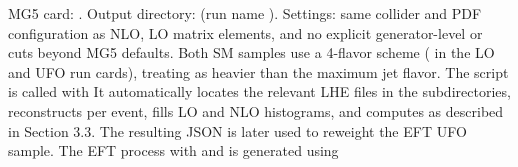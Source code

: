 \markdownRendererInterblockSeparator
{}\markdownRendererUlBeginTight
\markdownRendererUlItem MG5 card: .\markdownRendererUlItemEnd 
\markdownRendererUlItem Output directory:  (run name ).\markdownRendererUlItemEnd 
\markdownRendererUlItem Settings: same collider and PDF configuration as NLO, LO matrix elements, and no explicit generator-level  or \markdownRendererInlineMath{\eta} cuts beyond MG5 defaults.\markdownRendererUlItemEnd 
\markdownRendererUlEndTight \markdownRendererOlItemEnd 
\markdownRendererOlEnd \markdownRendererInterblockSeparator
{}Both SM samples use a 4-flavor scheme ( in the LO and UFO run cards), treating  as heavier than the maximum jet flavor.\markdownRendererInterblockSeparator
{}
\markdownRendererSectionEnd \markdownRendererSectionBegin
{}\markdownRendererInterblockSeparator
{}The script  is called with\markdownRendererInterblockSeparator
{}\markdownRendererInterblockSeparator
{}It automatically locates the relevant LHE files in the  subdirectories, reconstructs  per event, fills LO and NLO histograms, and computes  as described in Section 3.3. The resulting JSON is later used to reweight the EFT UFO sample.\markdownRendererInterblockSeparator
{}
\markdownRendererSectionEnd \markdownRendererSectionBegin
{}\markdownRendererInterblockSeparator
{}The EFT process  with  and  is generated using\markdownRendererInterblockSeparator
{}\markdownRendererInterblockSeparator
